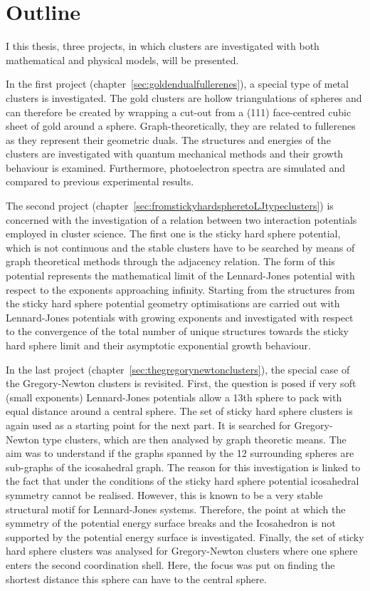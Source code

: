 \section{Outline}
\label{sec:Outline}

I this thesis, three projects, in which clusters are investigated with both mathematical and physical models, will be presented.

In the first project (chapter~\ref{sec:goldendualfullerenes}), a special type of
metal clusters is investigated. The gold clusters are hollow triangulations of
spheres and can therefore be created by wrapping a cut-out from a (111)
face-centred cubic sheet of gold around a sphere. Graph-theoretically, they are
related to fullerenes as they represent their geometric duals. The structures
and energies of the clusters are investigated with quantum mechanical methods
and their growth behaviour is examined. Furthermore, photoelectron spectra are
simulated and compared to previous experimental results.

The second project (chapter~\ref{sec:fromstickyhardspheretoLJtypeclusters}) is
concerned with the investigation of a relation between two interaction
potentials employed in cluster science. The first one is the sticky hard sphere
potential, which is not continuous and the stable clusters have to be searched
by means of graph theoretical methods through the adjacency relation. The form
of this potential represents the mathematical limit of the Lennard-Jones
potential with respect to the exponents approaching infinity. Starting from the
structures from the sticky hard sphere potential geometry optimisations are
carried out with Lennard-Jones potentials with growing exponents and
investigated with respect to the convergence of the total number of unique
structures towards the sticky hard sphere limit and their asymptotic exponential
growth behaviour.

In the last project (chapter~\ref{sec:thegregorynewtonclusters}), the special
case of the Gregory-Newton clusters is revisited. First, the question is posed
if very soft (small exponents) Lennard-Jones potentials allow a 13th sphere to
pack with equal distance around a central sphere. The set of sticky hard sphere
clusters is again used as a starting point for the next part. It is searched for
Gregory-Newton type clusters, which are then analysed by graph theoretic means.
The aim was to understand if the graphs spanned by the 12 surrounding spheres
are sub-graphs of the icosahedral graph. The reason for this investigation is
linked to the fact that under the conditions of the sticky hard sphere potential
icosahedral symmetry cannot be realised. However, this is known to be a very
stable structural motif for Lennard-Jones systems. Therefore, the point at which
the symmetry of the potential energy surface breaks and the Icosahedron is not
supported by the potential energy surface is investigated. Finally, the set of
sticky hard sphere clusters was analysed for Gregory-Newton clusters where one
sphere enters the second coordination shell. Here, the focus was put on finding
the shortest distance this sphere can have to the central sphere.



